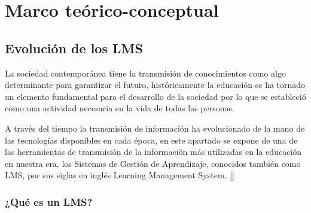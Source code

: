 \chapter{Marco teórico-conceptual}\label{chapter:state-of-the-art}

\section{Evolución de los LMS}
La sociedad contemporánea tiene la transmisión de conocimientos como algo determinante para garantizar el futuro, históricamente la educación se ha tornado un elemento fundamental para el desarrollo de la sociedad por lo que se estableció como una actividad necesaria en la vida de todas las personas.

A través del tiempo la transmisión de información ha evolucionado de la mano de las tecnologías disponibles en cada época, en este apartado se expone de una de las herramientas de transmisión de la información más utilizadas en la educación en nuestra era, los Sistemas de Gestión de Aprendizaje, conocidos también como LMS, por sus siglas en inglés Learning Management System. [\cite{bit4learn}]

\subsection{¿Qué es un LMS?}

